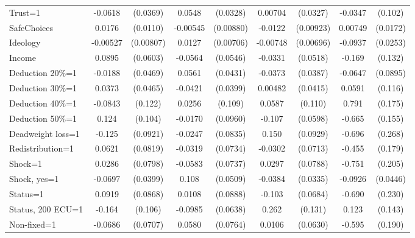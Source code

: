 \begin{tabular}{l|cccccc|cc}
Trust=1         &  -0.0618\sym{*}  & (0.0369)&   0.0548\sym{*}  & (0.0328)&  0.00704         & (0.0327)&  -0.0347         &  (0.102)\\
SafeChoices     &   0.0176         & (0.0110)& -0.00545         &(0.00880)&  -0.0122         &(0.00923)&  0.00749         & (0.0172)\\
Ideology        & -0.00527         &(0.00807)&   0.0127\sym{*}  &(0.00706)& -0.00748         &(0.00696)&  -0.0937\sym{***}& (0.0253)\\
Income          &   0.0895         & (0.0603)&  -0.0564         & (0.0546)&  -0.0331         & (0.0518)&   -0.169         &  (0.132)\\
Deduction 20\%=1&  -0.0188         & (0.0469)&   0.0561         & (0.0431)&  -0.0373         & (0.0387)&  -0.0647         & (0.0895)\\
Deduction 30\%=1&   0.0373         & (0.0465)&  -0.0421         & (0.0399)&  0.00482         & (0.0415)&   0.0591         &  (0.116)\\
Deduction 40\%=1&  -0.0843         &  (0.122)&   0.0256         &  (0.109)&   0.0587         &  (0.110)&    0.791\sym{***}&  (0.175)\\
Deduction 50\%=1&    0.124         &  (0.104)&  -0.0170         & (0.0960)&   -0.107\sym{*}  & (0.0598)&   -0.665\sym{***}&  (0.155)\\
Deadweight loss=1&   -0.125         & (0.0921)&  -0.0247         & (0.0835)&    0.150         & (0.0929)&   -0.696\sym{**} &  (0.268)\\
Redistribution=1&   0.0621         & (0.0819)&  -0.0319         & (0.0734)&  -0.0302         & (0.0713)&   -0.455\sym{**} &  (0.179)\\
Shock=1         &   0.0286         & (0.0798)&  -0.0583         & (0.0737)&   0.0297         & (0.0788)&   -0.751\sym{***}&  (0.205)\\
Shock, yes=1    &  -0.0697\sym{*}  & (0.0399)&    0.108\sym{**} & (0.0509)&  -0.0384         & (0.0335)&  -0.0926\sym{**} & (0.0446)\\
Status=1        &   0.0919         & (0.0868)&   0.0108         & (0.0888)&   -0.103         & (0.0684)&   -0.690\sym{***}&  (0.230)\\
Status, 200 ECU=1&   -0.164         &  (0.106)&  -0.0985         & (0.0638)&    0.262\sym{**} &  (0.131)&    0.123         &  (0.143)\\
Non-fixed=1     &  -0.0686         & (0.0707)&   0.0580         & (0.0764)&   0.0106         & (0.0630)&   -0.595\sym{***}&  (0.190)\\

\end{tabular}
